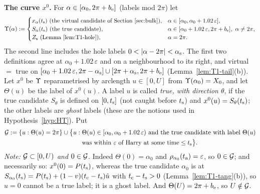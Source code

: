 \noindent\textbf{The curve $x^0$.} For $\alpha\in[\alpha_0,2\pi+b_{\mathrm e}]$ (labels mod $2\pi$) let
\[
\TDY(\alpha):=\begin{cases}
x_\alpha(\Bts)\ \text{(the virtual candidate of Section~\ref{sec:bulk})},&\alpha\in[\alpha_0,\alpha_0+1.02\,\varepsilon],\\
S_\alpha(\Bts)\ \text{(the true candidate)},&\alpha\in[\alpha_0+1.02\,\varepsilon,2\pi+\TDbe],\ \alpha\ne2\pi,\\
Z_{\mathrm s}\ \text{(Lemma~\ref{lem:T1-hole})},&\alpha=2\pi .
\end{cases}
\]
The second line includes the hole labels $0<|\alpha-2\pi|<\STas$. The first two definitions agree at $\alpha_0+1.02\,\varepsilon$ and on
a neighbourhood to its right, and virtual $=$ true on $[\alpha_0+1.02\,\varepsilon,2\pi-\alpha_{\mathrm s}]\cup[2\pi+\alpha_{\mathrm s},2\pi+b_{\mathrm e}]$
(Lemma~\ref{lem:T1-tail}(b)). Let $x^0$ be $\Upsilon$ reparametrised by arclength $u\in[0,U]$ from $\Upsilon(\alpha_0)=X_0$, and let
$\Theta(u)$ be the label of $x^0(u)$. A label $u$ is called \emph{true, with direction $\theta$}, if the true candidate $S_\theta$ is
defined on $[0,t_{\mathrm s}]$ (not caught before $t_{\mathrm s}$) and $x^0(u)=S_\theta(t_{\mathrm s})$; the other labels are \emph{ghost} labels
(these are the notions used in Hypothesis~\ref{hyp:HT}). Put
\begin{align*}
\mathcal G:=\{u:\Theta(u)=2\pi\}\cup\bigl\{u:{}&\Theta(u)\in[\alpha_0,\alpha_0+1.02\,\varepsilon)\text{ and the true candidate with label }\Theta(u)\\
&\text{was within $\varepsilon$ of Harry at some time}\le t_{\mathrm s}\bigr\}.
\end{align*}
\emph{Note: $\mathcal G\subset[0,U)$ and $0\in\mathcal G$.} Indeed $\Theta(0)=\alpha_0$ and $\rho_{\alpha_0}(t_{\mathrm a})=\varepsilon$, so $0\in\mathcal G$; and
necessarily so: $x^0(0)=P(t_{\mathrm s})$, whereas the true candidate $\alpha_0$ is at $S_{\alpha_0}(t_{\mathrm s})=P(t_{\mathrm s})+(1-v)(t_{\mathrm c}-t_{\mathrm s})\hat u$ with
$t_{\mathrm c}-t_{\mathrm s}>0$ (Lemma~\ref{lem:T1-tang}(b)), so $u=0$ cannot be a true label; it is a ghost label. And $\Theta(U)=2\pi+b_{\mathrm e}$, so
$U\notin\mathcal G$.

